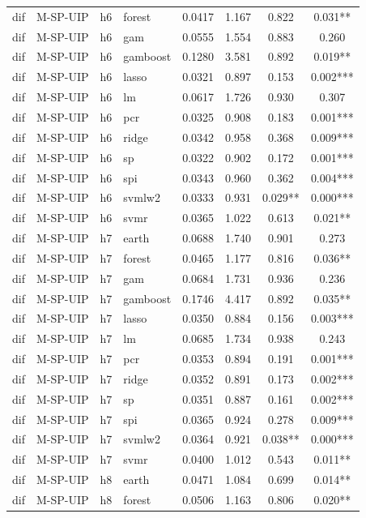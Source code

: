 \begin{ThreePartTable}
\begin{longtable}[t]{llclcccc}
dif & M-SP-UIP & h6 & forest & 0.0417 & 1.167 & 0.822 & 0.031**\\
dif & M-SP-UIP & h6 & gam & 0.0555 & 1.554 & 0.883 & 0.260\\
dif & M-SP-UIP & h6 & gamboost & 0.1280 & 3.581 & 0.892 & 0.019**\\
dif & M-SP-UIP & h6 & lasso & 0.0321 & 0.897 & 0.153 & 0.002***\\
dif & M-SP-UIP & h6 & lm & 0.0617 & 1.726 & 0.930 & 0.307\\
dif & M-SP-UIP & h6 & pcr & 0.0325 & 0.908 & 0.183 & 0.001***\\
dif & M-SP-UIP & h6 & ridge & 0.0342 & 0.958 & 0.368 & 0.009***\\
dif & M-SP-UIP & h6 & sp & 0.0322 & 0.902 & 0.172 & 0.001***\\
dif & M-SP-UIP & h6 & spi & 0.0343 & 0.960 & 0.362 & 0.004***\\
dif & M-SP-UIP & h6 & svmlw2 & 0.0333 & 0.931 & 0.029** & 0.000***\\
dif & M-SP-UIP & h6 & svmr & 0.0365 & 1.022 & 0.613 & 0.021**\\
\addlinespace
dif & M-SP-UIP & h7 & earth & 0.0688 & 1.740 & 0.901 & 0.273\\
dif & M-SP-UIP & h7 & forest & 0.0465 & 1.177 & 0.816 & 0.036**\\
dif & M-SP-UIP & h7 & gam & 0.0684 & 1.731 & 0.936 & 0.236\\
dif & M-SP-UIP & h7 & gamboost & 0.1746 & 4.417 & 0.892 & 0.035**\\
dif & M-SP-UIP & h7 & lasso & 0.0350 & 0.884 & 0.156 & 0.003***\\
dif & M-SP-UIP & h7 & lm & 0.0685 & 1.734 & 0.938 & 0.243\\
dif & M-SP-UIP & h7 & pcr & 0.0353 & 0.894 & 0.191 & 0.001***\\
dif & M-SP-UIP & h7 & ridge & 0.0352 & 0.891 & 0.173 & 0.002***\\
dif & M-SP-UIP & h7 & sp & 0.0351 & 0.887 & 0.161 & 0.002***\\
dif & M-SP-UIP & h7 & spi & 0.0365 & 0.924 & 0.278 & 0.009***\\
dif & M-SP-UIP & h7 & svmlw2 & 0.0364 & 0.921 & 0.038** & 0.000***\\
dif & M-SP-UIP & h7 & svmr & 0.0400 & 1.012 & 0.543 & 0.011**\\
\addlinespace
dif & M-SP-UIP & h8 & earth & 0.0471 & 1.084 & 0.699 & 0.014**\\
dif & M-SP-UIP & h8 & forest & 0.0506 & 1.163 & 0.806 & 0.020**\\

\end{longtable}
\end{ThreePartTable}
